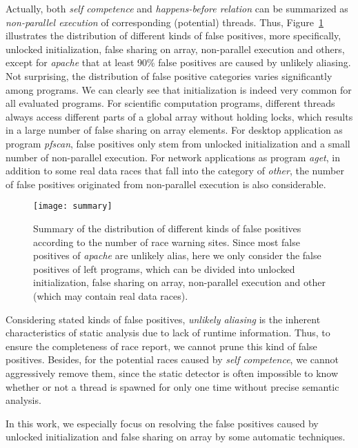 \documentclass[10pt,onecolumn,letterpaper]{article}
\begin{document}
Actually, both \emph{self competence} and \emph{happens-before
relation} can be summarized as \emph{non-parallel execution} of
corresponding (potential) threads. Thus, Figure~\ref{fig:sum}
illustrates the distribution of different kinds of false positives,
more specifically, unlocked initialization, false sharing on array,
non-parallel execution and others, except for \emph{apache} that at
least 90\% false positives are caused by unlikely aliasing. Not
surprising, the distribution of false positive categories varies
significantly among programs. We can clearly see that initialization
is indeed very common for all evaluated programs. For scientific
computation programs, different threads always access different
parts of a global array without holding locks, which results in a
large number of false sharing on array elements. For desktop
application as program \emph{pfscan}, false positives only stem from
unlocked initialization and a small number of non-parallel
execution. For network applications as program \emph{aget}, in
addition to some real data races that fall into the category of
\emph{other}, the number of false positives originated from
non-parallel execution is also considerable.

\begin{figure} [htbg]
\centering
\texttt{[image: summary]}
\caption{Summary of the distribution of different kinds of false
positives according to the number of race warning sites. Since most
false positives of \emph{apache} are unlikely alias, here we only
consider the false positives of left programs, which can be divided
into unlocked initialization, false sharing on array, non-parallel
execution and other (which may contain real data
races).}\label{fig:sum}
\end{figure}


Considering stated kinds of false positives, \emph{unlikely
aliasing} is the inherent characteristics of static analysis due to
lack of runtime information. Thus, to ensure the completeness of
race report, we cannot prune this kind of false positives. Besides,
for the potential races caused by \emph{self competence}, we cannot
aggressively remove them, since the static detector is often
impossible to know whether or not a thread is spawned for only one
time without precise semantic analysis.

In this work, we especially focus on resolving the false positives
caused by unlocked initialization and false sharing on array by some
automatic techniques.
\end{document}
